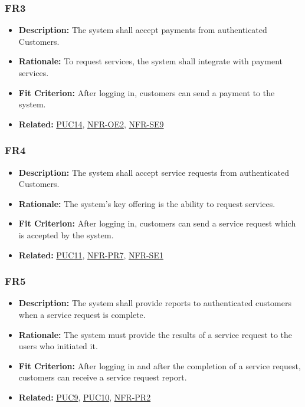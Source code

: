 \documentclass[12pt]{article}
\begin{document}
\subsubsection*{FR3}
\label{sec:FR3}
\begin{itemize}
  \item \textbf{Description:} The system shall accept payments from authenticated Customers.
  \item \textbf{Rationale:} To request services, the system shall integrate with payment services.
  \item \textbf{Fit Criterion:} After logging in, customers can send a payment to the system.
  \item \textbf{Related:} \hyperref[sec:PUC14]{PUC14}, \hyperref[sec:OE2]{NFR-OE2}, \hyperref[sec:SE9]{NFR-SE9}
\end{itemize}
\subsubsection*{FR4}
\label{sec:FR4}
\begin{itemize}
  \item \textbf{Description:} The system shall accept service requests from authenticated Customers.
  \item \textbf{Rationale:} The system’s key offering is the ability to request services.
  \item \textbf{Fit Criterion:} After logging in, customers can send a service request which is accepted by the system.
  \item \textbf{Related:} \hyperref[sec:PUC11]{PUC11}, \hyperref[sec:PR7]{NFR-PR7}, \hyperref[sec:SE1]{NFR-SE1}
\end{itemize}
\subsubsection*{FR5}
\label{sec:FR5}
\begin{itemize}
  \item \textbf{Description:} The system shall provide reports to authenticated customers when a service request is complete.
  \item \textbf{Rationale:} The system must provide the results of a service request to the users who initiated it.
  \item \textbf{Fit Criterion:} After logging in and after the completion of a service request, customers can receive a service request report.
  \item \textbf{Related:} \hyperref[sec:PUC9]{PUC9}, \hyperref[sec:PUC10]{PUC10}, \hyperref[sec:PR2]{NFR-PR2}
\end{itemize}
\end{document}

